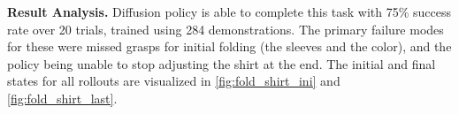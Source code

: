\textbf{Result Analysis.} Diffusion policy is able to complete this task with 75\% success rate over 20 trials, trained using 284 demonstrations. The primary failure modes for these were missed grasps for initial folding (the sleeves and the color), and the policy being unable to stop adjusting the shirt at the end. The initial and final states for all rollouts are visualized in \ref{fig:fold_shirt_ini} and \ref{fig:fold_shirt_last}.




